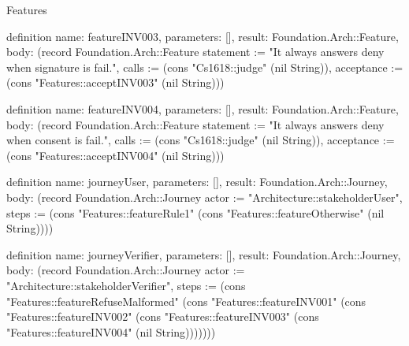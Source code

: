 \begin{lexlean}{Features}
\begin{semanticmodule}
definition{
  name: featureINV003,
  parameters: [],
  result: Foundation.Arch::Feature,
  body: (record Foundation.Arch::Feature {statement := "It always answers deny when signature is fail.", calls := (cons "Cs1618::judge" (nil String)), acceptance := (cons "Features::acceptINV003" (nil String))})
}

definition{
  name: featureINV004,
  parameters: [],
  result: Foundation.Arch::Feature,
  body: (record Foundation.Arch::Feature {statement := "It always answers deny when consent is fail.", calls := (cons "Cs1618::judge" (nil String)), acceptance := (cons "Features::acceptINV004" (nil String))})
}

definition{
  name: journeyUser,
  parameters: [],
  result: Foundation.Arch::Journey,
  body: (record Foundation.Arch::Journey {actor := "Architecture::stakeholderUser", steps := (cons "Features::featureRule1" (cons "Features::featureOtherwise" (nil String)))})
}

definition{
  name: journeyVerifier,
  parameters: [],
  result: Foundation.Arch::Journey,
  body: (record Foundation.Arch::Journey {actor := "Architecture::stakeholderVerifier", steps := (cons "Features::featureRefuseMalformed" (cons "Features::featureINV001" (cons "Features::featureINV002" (cons "Features::featureINV003" (cons "Features::featureINV004" (nil String))))))})
}
\end{semanticmodule}
\end{lexlean}
